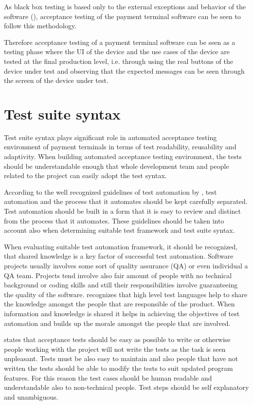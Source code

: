 As black box testing is based only to the external exceptions and behavior of the software (\emph{\cite{khan2012comparative}}), acceptance testing of the payment terminal software can be seen to follow this methodology.

Therefore acceptance testing of a payment terminal software can be seen as a testing phase where the UI of the device and the use cases of the device are tested at the final production level, i.e. through using the real buttons of the device under test and observing that the expected messages can be seen through the screen of the device under test.

\section{Test suite syntax}

Test suite syntax plays significant role in automated acceptance testing environment of payment terminals in terms of test readability, reusability and adaptivity. When building automated acceptance testing environment, the tests should be understandable enough that whole development team and people related to the project can easily adopt the test syntax.

According to the well recognized guidelines of test automation by \emph{\cite{snakeoil}}, test automation and the process that it automates should be kept carefully separated. Test automation should be built in a form that it is easy to review and distinct from the process that it automates. These guidelines should be taken into account also when determining suitable test framework and test suite syntax.

When evaluating suitable test automation framework, it should be recognized, that shared knowledge is a key factor of successful test automation. Software projects usually involves some sort of quality assurance (QA) or even individual a QA team. Projects tend involve also fair amount of people with no technical background or coding skills and still their responsibilities involve guaranteeing the quality of the software. \emph{\cite{just_enough}} recognizes that high level test languages help to share the knowledge amongst the people that are responsible of the product. When information and knowledge is shared it helps in achieving the objectives of test automation and builds up the morale amongst the people that are involved.

\emph{\cite{lowell2003successful}} states that acceptance tests should be easy as possible to write or otherwise people working with the project will not write the tests as the task is seen unpleasant. Tests must be also easy to maintain and also people that have not written the tests should be able to modify the tests to suit updated program features. For this reason the test cases should be human readable and understandable also to non-technical people. Test steps should be self explanatory and unambiguous.

